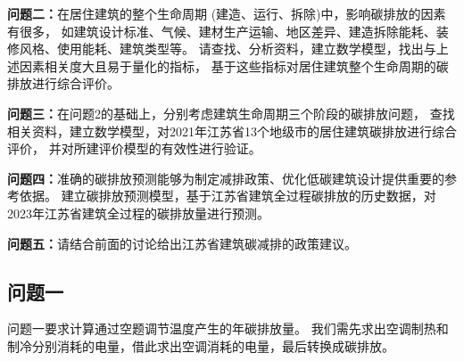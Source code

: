 \documentclass[a4paper, 12pt]{article}
\numberwithin{equation}{section}
\begin{document}
            \textbf{问题二：}在居住建筑的整个生命周期 (建造、运行、拆除)中，影响碳排放的因素有很多，
            如建筑设计标准、气候、建材生产运输、地区差异、建造拆除能耗、装修风格、使用能耗、建筑类型等。
            请查找、分析资料，建立数学模型，找出与上述因素相关度大且易于量化的指标，
            基于这些指标对居住建筑整个生命周期的碳排放进行综合评价。

            \textbf{问题三：}在问题2的基础上，分别考虑建筑生命周期三个阶段的碳排放问题，
            查找相关资料，建立数学模型，对2021年江苏省13个地级市的居住建筑碳排放进行综合评价，
            并对所建评价模型的有效性进行验证。

            \textbf{问题四：}准确的碳排放预测能够为制定减排政策、优化低碳建筑设计提供重要的参考依据。
            建立碳排放预测模型，基于江苏省建筑全过程碳排放的历史数据，对2023年江苏省建筑全过程的碳排放量进行预测。

            \textbf{问题五：}请结合前面的讨论给出江苏省建筑碳减排的政策建议。


    {}
        \subsection{问题一}
            问题一要求计算通过空题调节温度产生的年碳排放量。
            我们需先求出空调制热和制冷分别消耗的电量，借此求出空调消耗的电量，最后转换成碳排放。
\end{document}
